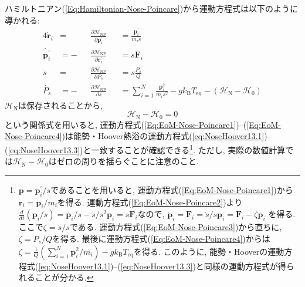 ハミルトニアン(\ref{Eq:Hamiltonian-Nose-Poincare})から運動方程式は以下のように導かれる:
\begin{alignat}{4}
  \dot{\bm{r}}_{i}
  &=&&
  \frac{\partial \mathcal{H}_{\mathrm{NP}}}{\partial \bm{p}_{i}^{\prime}}
  &&=
  \frac{\bm{p}_{i}^{\prime}}{m_{i}s}
  \label{Eq:EoM-Nose-Poincare1} \\
  \dot{\bm{p}_{i}^{\prime}}
  &=-&&
  \frac{\partial \mathcal{H}_{\mathrm{NP}}}{\partial \bm{r}_{i}^{\prime}}
  &&=
  s\bm{F}_{i}
  \label{Eq:EoM-Nose-Poincare2} \\
  \dot{s}
  &=&&
  \frac{\partial \mathcal{H}_{\mathrm{NP}}}{\partial P_{s}}
  &&=
  s \frac{P_{s}}{Q}
  \label{Eq:EoM-Nose-Poincare3} \\
  \dot{P_{s}}
  &=-&&
  \frac{\partial \mathcal{H}_{\mathrm{NP}}}{\partial s}
  &&=
  \sum_{i=1}^{N}
  \frac{\bm{p}_{i}^{2}}{m_{i}s^{2}}
  - g k_{\mathrm{B}} T_{\mathrm{eq}}
  - (\mathcal{H}_{\mathrm{N}} - \mathcal{H}_{0})
  \label{Eq:EoM-Nose-Poincare4}
\end{alignat}
$\mathcal{H}_{\mathrm{N}}$は保存されることから,　
\begin{equation}
  \mathcal{H}_{\mathrm{N}} - \mathcal{H}_{0} = 0
\end{equation}
という関係式を用いると, 運動方程式(\ref{Eq:EoM-Nose-Poincare1})--(\ref{Eq:EoM-Nose-Poincare4})は能勢・Hoover熱浴の運動方程式(\ref{eq:NoseHoover13.1})--(\ref{eq:NoseHoover13.3})と一致することが確認できる\footnote{
  $\bm{p}= \bm{p}_{i}^{\prime}/s$であることを用いると, 
  運動方程式(\ref{Eq:EoM-Nose-Poincare1})から$\dot{\bm{r}}_{i} = \bm{p}_{i} / m_{i}$を得る.
  運動方程式(\ref{Eq:EoM-Nose-Poincare2})より
  $\frac{d}{dt}(\bm{p}_{i}/s)
  = \dot{\bm{p}_{i}}/s - \dot{s}/s^{2} \bm{p}_{i}
  = s\bm{F}_{i}$なので,
  $\dot{\bm{p}}_{i}
  = \bm{F}_{i}
  = \dot{s}/s \bm{p}_{i}
  = \bm{F}_{i} - \zeta \bm{p}_{i}$
  を得る. ここで$\zeta = \dot{s}/s$である.
  運動方程式(\ref{Eq:EoM-Nose-Poincare3})から直ちに, 
  $\zeta = P_{s} / Q$を得る.
  最後に運動方程式(\ref{Eq:EoM-Nose-Poincare4})からは
  $\dot{\zeta} = \frac{1}{Q}(\sum_{i=1}^{N} \bm{p}_{i}^{2}/m_{i}) - g k_{\mathrm{B}} T_{\mathrm{eq}}$を得る.
  このように, 能勢・Hooverの運動方程式(\ref{eq:NoseHoover13.1})--(\ref{eq:NoseHoover13.3})と同様の運動方程式が得られることが分かる.
}.
ただし, 実際の数値計算では$\mathcal{H}_{\mathrm{N}} - \mathcal{H}_{0}$はゼロの周りを揺らぐことに注意のこと.

